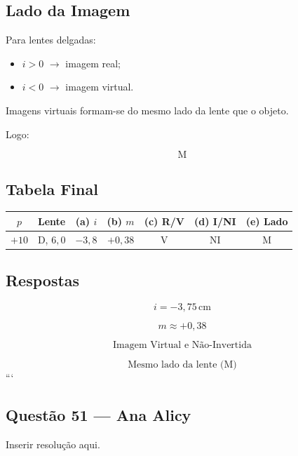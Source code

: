 \documentclass[12pt,a4paper]{article}
\begin{document}
\subsection*{Lado da Imagem}

Para lentes delgadas:

\begin{itemize}
    \item $i > 0$ $\rightarrow$ imagem real;
    \item $i < 0$ $\rightarrow$ imagem virtual.
\end{itemize}

Imagens virtuais formam-se do mesmo lado da lente que o objeto.

Logo:

\[
\boxed{\text{M}}
\]


\subsection*{Tabela Final}

\begin{center}
\begin{tabular}{ccccccc}
\hline

$p$ & Lente & (a) $i$ & (b) $m$
& (c) R/V & (d) I/NI & (e) Lado \\

\hline

$+10$ & D, $6,0$
& $-3,8$
& $+0,38$
& V
& NI
& M \\

\hline
\end{tabular}
\end{center}


\subsection*{Respostas}

\[
\boxed{
i = -3,75\,\text{cm}
}
\]

\[
\boxed{
m \approx +0,38
}
\]

\[
\boxed{
\text{Imagem Virtual e Não-Invertida}
}
\]

\[
\boxed{
\text{Mesmo lado da lente (M)}
}
\]
```


\subsection{Questão 51 — Ana Alicy}
Inserir resolução aqui.
\end{document}
